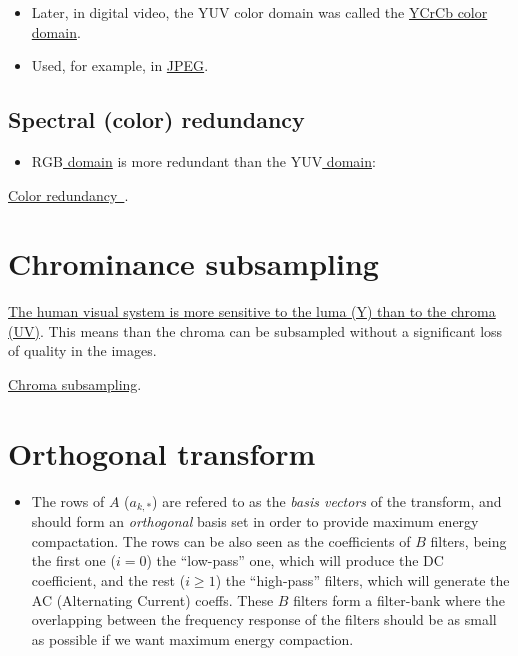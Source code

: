 \begin{itemize}
\item
  Later, in digital video, the YUV color domain was called the
  \href{https://en.wikipedia.org/wiki/YCbCr}{YCrCb color domain}.
\item
  Used, for example, in \href{https://en.wikipedia.org/wiki/JPEG}{JPEG}.
\end{itemize}

\subsection{Spectral (color) redundancy}
\begin{itemize}
\tightlist
\item
  \href{https://en.wikipedia.org/wiki/RGB_color_model}{\(\text{RGB}\)
  domain} is more redundant than the
  \href{https://en.wikipedia.org/wiki/YUV}{\(\text{YUV}\) domain}:
\end{itemize}

\href{https://nbviewer.jupyter.org/github/vicente-gonzalez-ruiz/image_transformations_for_coding/blob/master/color_redundancy.ipynb}{Color
  redundancy~\cite{barr__image, gouillart__scikit, solem__programming}}.

\section{Chrominance subsampling}
\href{https://en.wikipedia.org/wiki/Chroma_subsampling}{The human visual
system is more sensitive to the luma (Y) than to the chroma (UV)}. This
means than the chroma can be subsampled without a significant loss of
quality in the images.


\href{https://nbviewer.jupyter.org/github/vicente-gonzalez-ruiz/image_transformations_for_coding/blob/master/chroma_subsampling.ipynb}{Chroma subsampling}.

\section{Orthogonal transform}
\begin{itemize}
\tightlist
\item
  The rows of \(A\) (\(a_{k,*}\)) are refered to as the \emph{basis
  vectors} of the transform, and should form an \emph{orthogonal} basis
  set in order to provide maximum energy compactation. The rows can be
  also seen as the coefficients of \(B\) filters, being the first one
  (\(i=0\)) the ``low-pass'' one, which will produce the DC coefficient,
  and the rest (\(i\geq 1\)) the ``high-pass'' filters, which will
  generate the AC (Alternating Current) coeffs. These \(B\) filters form
  a filter-bank where the overlapping between the frequency response of
  the filters should be as small as possible if we want maximum energy
  compaction.
\end{itemize}

